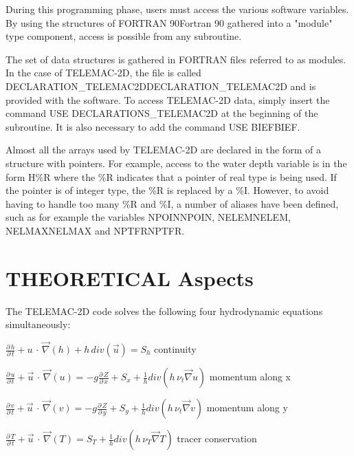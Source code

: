 \documentclass{article} %
\begin{document}
 During this programming phase, users must access the various software variables. By using the structures of FORTRAN 90Fortran 90 gathered into a "module" type component, access is possible from any subroutine.

 The set of data structures is gathered in FORTRAN files referred to as modules. In the case of TELEMAC-2D, the file is called DECLARATION\_TELEMAC2DDECLARATION\_TELEMAC2D and is provided with the software. To access TELEMAC-2D data, simply insert the command USE DECLARATIONS\_TELEMAC2D at the beginning of the subroutine. It is also necessary to add the command USE BIEFBIEF.



 Almost all the arrays used by TELEMAC-2D are declared in the form of a structure with pointers. For example, access to the water depth variable is in the form H\%R where the \%R indicates that a pointer of real type is being used. If the pointer is of integer type, the \%R is replaced by a \%I. However, to avoid having to handle too many \%R and \%I, a number of aliases have been defined, such as for example the variables NPOINNPOIN, NELEMNELEM, NELMAXNELMAX and NPTFRNPTFR.




















\section{  THEORETICAL Aspects}

 The TELEMAC-2D code solves the following four hydrodynamic equations simultaneously:

 $\frac{\partial \, h}{\partial \, t} +u\, \cdot \, \vec{\nabla }(h)+h\, div(\vec{u})=S_{h} $    continuity

 $\frac{\partial \, u}{\partial \, t} +\vec{u}\, \cdot \, \vec{\nabla }(u)=-g\frac{\partial \, Z}{\partial \, x} +S_{x} +\frac{1}{h} div(h\, \nu _{t} \vec{\nabla }u)$  momentum along x

 $\frac{\partial \, v}{\partial \, t} +\vec{u}\, \cdot \, \vec{\nabla }(v)=-g\frac{\partial \, Z}{\partial \, y} +S_{y} +\frac{1}{h} div(h\, \nu _{t} \vec{\nabla }v)$  momentum along y

 $\frac{\partial \, T}{\partial \, t} +\vec{u}\, \cdot \, \vec{\nabla }(T)=S_{T} +\frac{1}{h} div(h\, \nu _{T} \vec{\nabla }T)$   tracer conservation
\end{document}

